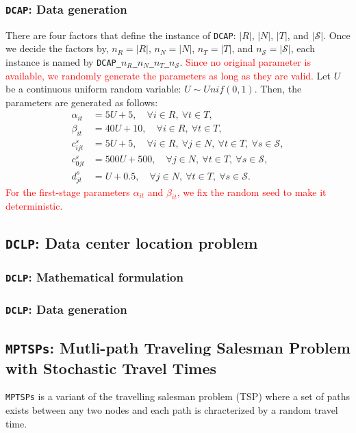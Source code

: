 \subsubsection{\texttt{DCAP}: Data generation} 
There are four factors that define the instance of \texttt{DCAP}: $|R|$, $|N|$, $|T|$, and $|\mathcal{S}|$. Once we decide the factors by, $n_R=|R|$, $n_N=|N|$, $n_T=|T|$, and $n_\mathcal{S}=|\mathcal{S}|$, each instance is named by \texttt{DCAP\_$n_R$\_$n_N$\_$n_T$\_$n_\mathcal{S}$}. \textcolor{red}{Since no original parameter is available, we randomly generate the parameters as long as they are valid.} Let $U$ be a continuous uniform random variable: $U\sim Unif(0,1)$. Then, the parameters are generated as follows:
\begin{align*}
	\alpha_{it}&=5U+5,\quad\forall i\in R,\ \forall t\in T, \\
	\beta_{it} &=40U+10,\quad\forall i\in R,\ \forall t\in T, \\
	c_{ijt}^s  &=5U+5,\quad\forall i\in R,\ \forall j\in N,\ \forall t\in T,\ \forall s\in\mathcal{S}, \\
	c_{0jt}^s  &=500U+500,\quad\forall j\in N,\ \forall t\in T,\ \forall s\in\mathcal{S}, \\
	d_{jt}^s   &=U+0.5,\quad\forall j\in N,\ \forall t\in T,\ \forall s\in\mathcal{S}.
\end{align*}
\textcolor{red}{For the first-stage parameters $\alpha_{it}$ and $\beta_{it}$, we fix the random seed to make it deterministic.}

\subsection{\texttt{DCLP}: Data center location problem} \label{DCLP}

\subsubsection{\texttt{DCLP}: Mathematical formulation}

\subsubsection{\texttt{DCLP}: Data generation}


\subsection{\texttt{MPTSPs}: Mutli-path Traveling Salesman Problem with Stochastic Travel Times} \label{MPTSPs}
\texttt{MPTSPs} is a variant of the travelling salesman problem (TSP) where a set of paths exists between any two nodes and each path is chracterized by a random travel time. 

